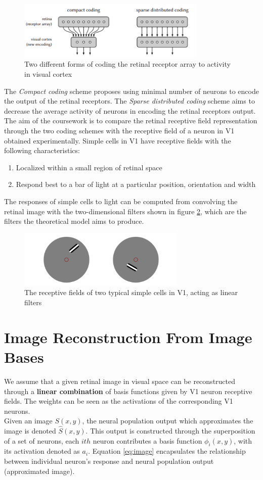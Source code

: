 \documentclass[journal]{IEEEtran}
\begin{document}
\begin{figure}[htbp]
\centering     %
\includegraphics[width=90mm]{s3.PNG}
\caption{Two different forms of coding the retinal receptor array to activity in visual cortex}
\label{fig:3}
\end{figure}
 The \textit{Compact coding} scheme proposes using minimal number of neurons to encode the output of the retinal receptors. The \textit{Sparse distributed coding} scheme aims to decrease the average activity of neurons in encoding the retinal receptors output.\\
 The aim of the coursework is to compare the retinal receptive field representation through the two coding schemes with the receptive field of a neuron in V1 obtained experimentally. Simple cells in V1 have receptive fields with the following characteristics:
 \begin{enumerate}
     \item Localized within a small region of retinal space
     \item Respond best to a bar of light at a particular position, orientation and width
 \end{enumerate}
The responses of simple cells to light can be computed from convolving the retinal image with the two-dimensional filters shown in figure \ref{fig:simple_cells}, which are the filters the theoretical model aims to produce.
\begin{figure}[htbp]
\centering     %
\includegraphics[width=80mm]{s4.PNG}
\caption{The receptive fields of two typical simple cells in V1, acting as linear filters}
\label{fig:simple_cells}
\end{figure}

\section{Image Reconstruction From Image Bases}
We assume that a given retinal image in visual space can be reconstructed through a \textbf{linear combination} of basis functions given by V1 neuron receptive fields. The weights can be seen as the activations of the corresponding V1 neurons. \\
Given an image $S(x,y)$, the neural population output which approximates the image is denoted $\hat{S}(x,y)$. This output is constructed through the superposition of a set of neurons, each $ith$ neuron contributes a basis function $\phi_i(x,y)$, with its activation denoted as $a_i$. Equation \ref{eq:image} encapsulates the relationship between individual neuron's response and neural population output (approximated image).
\end{document}
